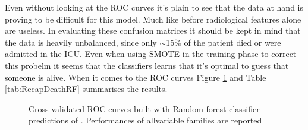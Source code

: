 Even without looking at the ROC curves it's plain to see that the data at hand is proving to be difficult for this model. Much like before radiological features alone are useless.
In evaluating these confusion matrices it should be kept in mind that the data is heavily unbalanced, since only $\sim$15\% of the patient died or were admitted in the ICU.
Even when using SMOTE in the training phase to correct this probelm it seems that the classifiers learns that it's optimal to guess that someone is alive. When it comes to the ROC curves Figure \ref{fig:RFDeathROC} and Table \ref{tab:RecapDeathRF} summarises the results.

\begin{figure}[H]
\centering
	\newline
        \caption{Cross-validated ROC curves built with Random forest classifier predictions of \death. Performances of allvariable families are reported }\label{fig:RFDeathROC}
\end{figure}

